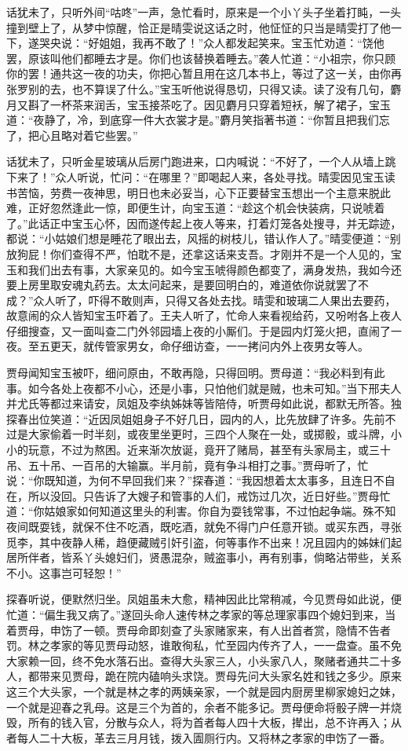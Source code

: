 \documentclass[12pt,oneside]{book}
\begin{document}
话犹未了，只听外间“咕咚”一声，急忙看时，原来是一个小丫头子坐着打盹，一头撞到壁上了，从梦中惊醒，恰正是晴雯说这话之时，他怔怔的只当是晴雯打了他一下，遂哭央说：“好姐姐，我再不敢了！”众人都发起笑来。宝玉忙劝道：“饶他罢，原该叫他们都睡去才是。你们也该替换着睡去。”袭人忙道：“小祖宗，你只顾你的罢！通共这一夜的功夫，你把心暂且用在这几本书上，等过了这一关，由你再张罗别的去，也不算误了什么。”宝玉听他说得恳切，只得又读。读了没有几句，麝月又斟了一杯茶来润舌，宝玉接茶吃了。因见麝月只穿着短袄，解了裙子，宝玉道：“夜静了，冷，到底穿一件大衣裳才是。”麝月笑指著书道：“你暂且把我们忘了，把心且略对着它些罢。”

话犹未了，只听金星玻璃从后房门跑进来，口内喊说：“不好了，一个人从墙上跳下来了！”众人听说，忙问：“在哪里？”即喝起人来，各处寻找。晴雯因见宝玉读书苦恼，劳费一夜神思，明日也未必妥当，心下正要替宝玉想出一个主意来脱此难，正好忽然逢此一惊，即便生计，向宝玉道：“趁这个机会快装病，只说唬着了。”此话正中宝玉心怀，因而遂传起上夜人等来，打着灯笼各处搜寻，并无踪迹，都说：“小姑娘们想是睡花了眼出去，风摇的树枝儿，错认作人了。”晴雯便道：“别放狗屁！你们查得不严，怕耽不是，还拿这话来支吾。才刚并不是一个人见的，宝玉和我们出去有事，大家亲见的。如今宝玉唬得颜色都变了，满身发热，我如今还要上房里取安魂丸药去。太太问起来，是要回明白的，难道依你说就罢了不成？”众人听了，吓得不敢则声，只得又各处去找。晴雯和玻璃二人果出去要药，故意闹的众人皆知宝玉吓着了。王夫人听了，忙命人来看视给药，又吩咐各上夜人仔细搜查，又一面叫查二门外邻园墙上夜的小厮们。于是园内灯笼火把，直闹了一夜。至五更天，就传管家男女，命仔细访查，一一拷问内外上夜男女等人。

贾母闻知宝玉被吓，细问原由，不敢再隐，只得回明。贾母道：“我必料到有此事。如今各处上夜都不小心，还是小事，只怕他们就是贼，也未可知。”当下邢夫人并尤氏等都过来请安，凤姐及李纨姊妹等皆陪侍，听贾母如此说，都默无所答。独探春出位笑道：“近因凤姐姐身子不好几日，园内的人，比先放肆了许多。先前不过是大家偷着一时半刻，或夜里坐更时，三四个人聚在一处，或掷骰，或斗牌，小小的玩意，不过为熬困。近来渐次放诞，竟开了赌局，甚至有头家局主，或三十吊、五十吊、一百吊的大输赢。半月前，竟有争斗相打之事。”贾母听了，忙说：“你既知道，为何不早回我们来？”探春道：“我因想着太太事多，且连日不自在，所以没回。只告诉了大嫂子和管事的人们，戒饬过几次，近日好些。”贾母忙道：“你姑娘家如何知道这里头的利害。你自为耍钱常事，不过怕起争端。殊不知夜间既耍钱，就保不住不吃酒，既吃酒，就免不得门户任意开锁。或买东西，寻张觅李，其中夜静人稀，趋便藏贼引奸引盗，何等事作不出来！况且园内的姊妹们起居所伴者，皆系丫头媳妇们，贤愚混杂，贼盗事小，再有别事，倘略沾带些，关系不小。这事岂可轻恕！”

探春听说，便默然归坐。凤姐虽未大愈，精神因此比常稍减，今见贾母如此说，便忙道：“偏生我又病了。”遂回头命人速传林之孝家的等总理家事四个媳妇到来，当着贾母，申饬了一顿。贾母命即刻查了头家赌家来，有人出首者赏，隐情不告者罚。林之孝家的等见贾母动怒，谁敢徇私，忙至园内传齐了人，一一盘查。虽不免大家赖一回，终不免水落石出。查得大头家三人，小头家八人，聚赌者通共二十多人，都带来见贾母，跪在院内磕响头求饶。贾母先问大头家名姓和钱之多少。原来这三个大头家，一个就是林之孝的两姨亲家，一个就是园内厨房里柳家媳妇之妹，一个就是迎春之乳母。这是三个为首的，余者不能多记。贾母便命将骰子牌一并烧毁，所有的钱入官，分散与众人，将为首者每人四十大板，撵出，总不许再入；从者每人二十大板，革去三月月钱，拨入圊厕行内。又将林之孝家的申饬了一番。
\end{document}
